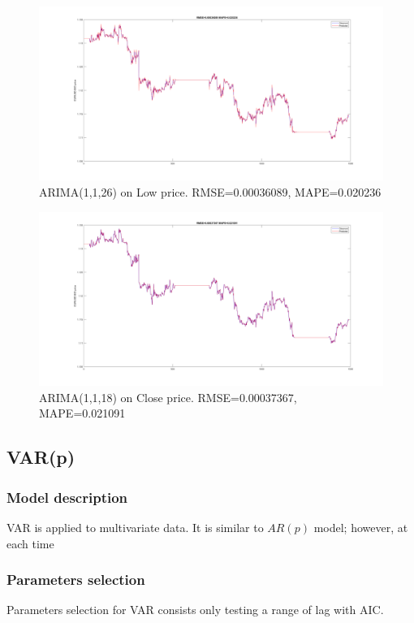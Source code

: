 \documentclass[11pt]{article}
\begin{document}
\begin{figure}[H]
  \centering
  \includegraphics[width=\linewidth,keepaspectratio]{figs/arima_26_1_1_low.png}
  \caption{ARIMA(1,1,26) on Low price. RMSE=0.00036089, MAPE=0.020236}
\end{figure}

\begin{figure}[H]
  \centering
  \includegraphics[width=\linewidth,keepaspectratio]{figs/arima_1_1_18_close.png}
  \caption{ARIMA(1,1,18) on Close price. RMSE=0.00037367, MAPE=0.021091}
\end{figure}


\subsection{VAR(p)}
\subsubsection{Model description}
VAR is applied to multivariate data. It is similar to $AR(p)$ model; however, at
each time

\subsubsection{Parameters selection}
Parameters selection for VAR consists only testing a range of lag with AIC. 
\end{document}
